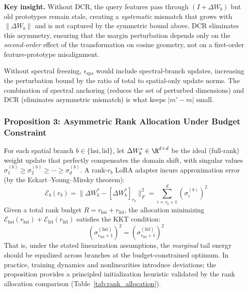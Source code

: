 \textbf{Key insight.}
Without DCR, the query features pass through $(I + \Delta W_b)$ but old prototypes remain stale, creating a \emph{systematic} mismatch that grows with $\|\Delta W_b\|$ and is not captured by the symmetric bound above.
DCR eliminates this asymmetry, ensuring that the margin perturbation depends only on the \emph{second-order} effect of the transformation on cosine geometry, not on a first-order feature-prototype misalignment.

Without spectral freezing, $\epsilon_{\mathrm{spa}}$ would include spectral-branch updates, increasing the perturbation bound by the ratio of total to spatial-only update norms.
The combination of spectral anchoring (reduces the set of perturbed dimensions) and DCR (eliminates asymmetric mismatch) is what keeps $|m' - m|$ small.

\subsubsection{Proposition 3: Asymmetric Rank Allocation Under Budget Constraint}
\label{app:rank_allocation}

\begin{proposition}
\label{prop:rank}
For each spatial branch $b \in \{\mathrm{hsi, lid}\}$, let $\Delta W_b^* \in \R^{d \times d}$ be the ideal (full-rank) weight update that perfectly compensates the domain shift, with singular values $\sigma_1^{(b)} \geq \sigma_2^{(b)} \geq \cdots \geq \sigma_d^{(b)}$.
A rank-$r_b$ LoRA adapter incurs approximation error (by the Eckart--Young--Mirsky theorem):
\begin{equation}
    \mathcal{E}_b(r_b) = \|\Delta W_b^* - [\Delta W_b^*]_{r_b}\|_F^2 = \sum_{i=r_b+1}^{d} (\sigma_i^{(b)})^2
\label{eq:eckart_young}
\end{equation}
Given a total rank budget $R = r_{\mathrm{hsi}} + r_{\mathrm{lid}}$, the allocation minimizing $\mathcal{E}_{\mathrm{hsi}}(r_{\mathrm{hsi}}) + \mathcal{E}_{\mathrm{lid}}(r_{\mathrm{lid}})$ satisfies the KKT condition:
\begin{equation}
    (\sigma_{r_{\mathrm{hsi}}+1}^{(\mathrm{hsi})})^2 = (\sigma_{r_{\mathrm{lid}}+1}^{(\mathrm{lid})})^2
\label{eq:kkt_rank}
\end{equation}
That is, under the stated linearization assumptions, the \emph{marginal} tail energy should be equalized across branches at the budget-constrained optimum. In practice, training dynamics and nonlinearities introduce deviations; the proposition provides a principled initialization heuristic validated by the rank allocation comparison (Table~\ref{tab:rank_allocation}).
\end{proposition}

